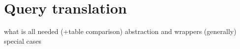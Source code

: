 \chapter{Query translation}
what is all needed (+table comparison)
abstraction and wrappers (generally)
special cases